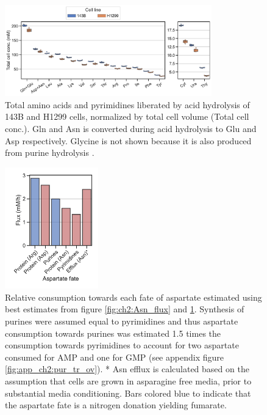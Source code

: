 \begin{figure}
    \centering
    \includegraphics[width=0.80\textwidth]{figures/chap2/ah_cell_comp.pdf}
    \caption[Amino acid and pyrimidine total cell concentration.]{
    Total amino acids and pyrimidines liberated by acid hydrolysis of 143B and H1299 cells, normalized by total cell volume (Total cell conc.).
    Gln and Asn is converted during acid hydrolysis to Glu and Asp respectively.
    Glycine is not shown because it is also produced from purine hydrolysis \cite{Markham1949-qy}.
    }
    \label{fig:ch2:ah_cell_comp}
\end{figure}

\begin{figure}[ht]
    \centering
    \includegraphics[width=0.36\textwidth]{figures/chap2/asp_fate.pdf}
    \caption[Relative consumption towards each fate of aspartate.]{
    Relative consumption towards each fate of aspartate estimated using best estimates from figure \ref{fig:ch2:Asn_flux} and \ref{fig:ch2:ah_cell_comp}.
    Synthesis of purines were assumed equal to pyrimidines and thus aspartate consumption towards purines was estimated 1.5 times the consumption towards pyrimidines to account for two aspartate consumed for AMP and one for GMP (see appendix figure \ref{fig:app_ch2:pur_tr_ov}).
    * Asn efflux is calculated based on the assumption that cells are grown in asparagine free media, prior to substantial media conditioning.
    Bars colored blue to indicate that the aspartate fate is a nitrogen donation yielding fumarate.
    }
    \label{fig:ch2:asp_fate}
\end{figure}




